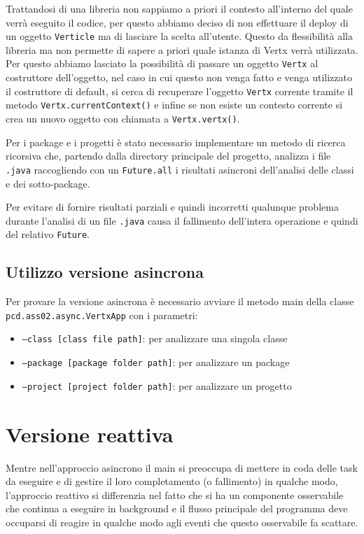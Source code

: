 \documentclass[11pt,notitlepage]{article}
\begin{document}
Trattandosi di una libreria non sappiamo a priori il contesto all'interno del quale verrà eseguito il codice, per questo abbiamo deciso di non effettuare il deploy di
un oggetto \texttt{Verticle} ma di lasciare la scelta all'utente. Questo da flessibilità alla libreria ma non permette di sapere a priori quale istanza di Vertx verrà utilizzata.
Per questo abbiamo lasciato la possibilità di passare un oggetto \texttt{Vertx} al costruttore dell'oggetto, nel caso in cui questo non venga fatto e venga utilizzato il costruttore
di default, si cerca di recuperare l'oggetto \texttt{Vertx} corrente tramite il metodo \texttt{Vertx.currentContext()} e infine se non esiste un contesto corrente si crea un nuovo
oggetto con chiamata a \texttt{Vertx.vertx()}.

Per i package e i progetti è stato necessario implementare un metodo di ricerca ricorsiva che, partendo dalla directory principale del progetto, analizza i file \texttt{.java}
raccogliendo con un \texttt{Future.all} i risultati asincroni dell'analisi delle classi e dei sotto-package.

Per evitare di fornire risultati parziali e quindi incorretti qualunque problema durante l'analisi di un file \texttt{.java} causa il fallimento dell'intera operazione 
e quindi del relativo \texttt{Future}.

\subsection{Utilizzo versione asincrona}
Per provare la versione asincrona è necessario avviare il metodo main della classe \texttt{pcd.ass02.async.VertxApp} con i parametri:
\begin{itemize}
    \item \texttt{--class [class file path]}: per analizzare una singola classe
    \item \texttt{--package [package folder path]}: per analizzare un package
    \item \texttt{--project [project folder path]}: per analizzare un progetto
\end{itemize}

\section{Versione reattiva}
Mentre nell'approccio asincrono il main si preoccupa di mettere in coda delle task da eseguire e di gestire il loro completamento (o fallimento) in qualche modo, 
l'approccio reattivo si differenzia nel fatto che si ha un componente osservabile che continua a eseguire in background e il flusso principale del programma deve 
occuparsi di reagire in qualche modo agli eventi che questo osservabile fa scattare. 
\end{document}
